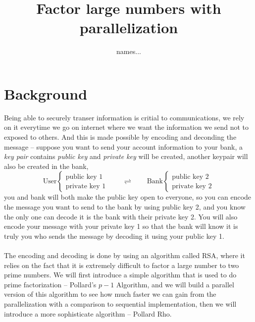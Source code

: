 \documentclass[10pt]{article}
\begin{document}
\title{Factor large numbers with parallelization}
\author{names...}
\maketitle

\section{Background}
Being able to securely transer information is critial to communications, we rely on it everytime we go on internet where we want the information we send not to exposed to others. And this is made possible by encoding and deconding the message -- suppose you want to send your account information to your bank, a \textit{key pair} contains \textit{public key} and \textit{private key} will be created, another keypair will also be created in the bank,
\begin{equation*}
\text{User} 
\begin{cases}
\text{public key 1}\\
\text{private key 1}            
\end{cases}\qquad \rightleftharpoons \qquad
\text{Bank} 
\begin{cases}
\text{public key 2}\\
\text{private key 2} 
\end{cases}
\end{equation*}
you and bank will both make the public key open to everyone, so you can encode the message you want to send to the bank by using public key 2, and you know the only one can decode it is the bank with their private key 2. You will also encode your message with your private key 1 so that the bank will know it is truly you who sends the message by decoding it using your public key 1. \\
\-\ \\
The encoding and decoding is done by using an algorithm called RSA, where it relies on the fact that it is extremely difficult to factor a large number to two prime numbers. We will first introduce a simple algorithm that is used to do prime factorization -- Pollard's $p-1$ Algorithm, and we will build a parallel version of this algorithm to see how much faster we can gain from the parallelization with a comparison to sequential implementation, then we will introduce a more sophisticate algorithm -- Pollard Rho.  
\end{document}
